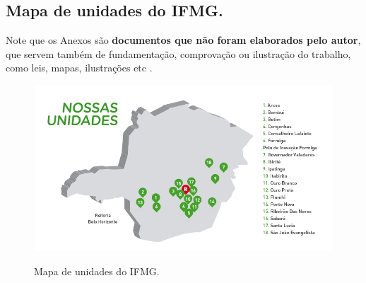 
\begin{anexosenv}
\chapter{Mapa de unidades do IFMG.}
\label{anexoA}

Note que os  Anexos são  \textbf{documentos  que não foram  elaborados  pelo  autor},  que  servem  também  de  fundamentação, comprovação ou ilustração do trabalho, como leis, mapas, ilustrações etc .

\begin{figure}[H] %
   \begin{center}
    \caption{Mapa de unidades do IFMG.} %
    \label{fig:mapas}
    \includegraphics[width=1\linewidth]{Figuras/mapasitenovonov2018b.png} \\
    \end{center}
    \fontsize{10}{12}
\end{figure}



\end{anexosenv}
